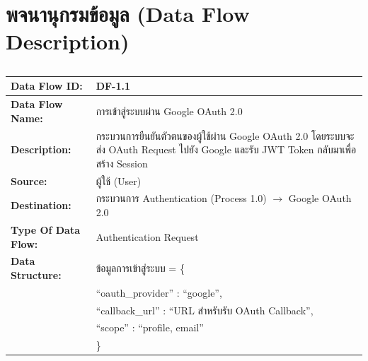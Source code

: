\section{พจนานุกรมข้อมูล (Data Flow Description)}


\begin{table}[H]
    \caption{}
    \label{tab:df-1-1}
    \fontSixTeen 
    \begin{tabularx}{\textwidth}{|l|L|} 
        \hline
        \textbf{Data Flow ID:} & DF-1.1 \\
        \hline
        \textbf{Data Flow Name:} & การเข้าสู่ระบบผ่าน Google OAuth 2.0 \\
        \hline
        \textbf{Description:} & กระบวนการยืนยันตัวตนของผู้ใช้ผ่าน Google OAuth 2.0 โดยระบบจะส่ง OAuth Request ไปยัง Google และรับ JWT Token กลับมาเพื่อสร้าง Session \\
        \hline
        \textbf{Source:} & ผู้ใช้ (User) \\
        \hline
        \textbf{Destination:} & กระบวนการ Authentication (Process 1.0) $\rightarrow$ Google OAuth 2.0 \\
        \hline
        \textbf{Type Of Data Flow:} & Authentication Request \\
        \hline
        \textbf{Data Structure:} & ข้อมูลการเข้าสู่ระบบ = \{ \nonumber \\
                        & \hspace{1em} ``oauth\_provider'' : ``google'', \nonumber \\
                        & \hspace{1em} ``callback\_url'' : ``URL สำหรับรับ OAuth Callback'', \nonumber \\
                        & \hspace{1em} ``scope'' : ``profile, email'' \nonumber \\
                        & \} \\
        \hline
    \end{tabularx}
\end{table}

